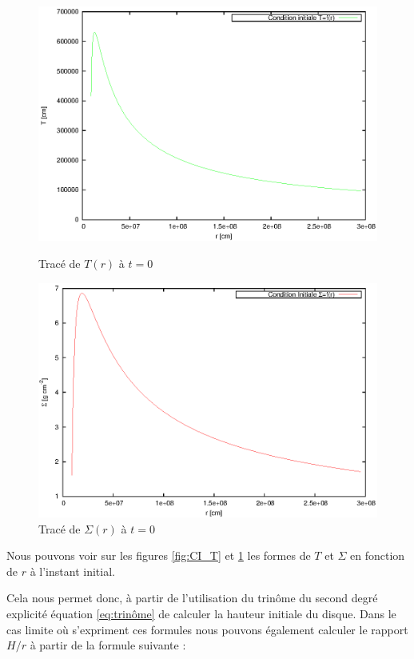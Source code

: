  \begin{figure}[ht]
   \begin{minipage}[c]{.46\linewidth}
      \includegraphics[scale=0.6]{ic_T.eps}
      \caption{Tracé de $T(r)$ à $t = 0$}\label{fig:CI_T}
   \end{minipage} \hfill
   \begin{minipage}[c]{.46\linewidth}
      \includegraphics[scale=0.6]{ic_Sig.eps}
      \caption{Tracé de $\Sigma(r)$ à $t = 0$}\label{fig:CI_Sig}
   \end{minipage}
\end{figure} 


Nous pouvons voir sur les figures \ref{fig:CI_T} et \ref{fig:CI_Sig} les formes de $T$ et $\Sigma$ en fonction de $r$ à l'instant initial.

Cela nous permet donc, à partir de l'utilisation du trinôme du second degré explicité équation \eqref{eq:trinôme} de calculer la hauteur initiale du disque. Dans le cas limite où s'expriment ces formules nous pouvons également calculer le rapport $H/r$ à partir de la formule suivante : 

